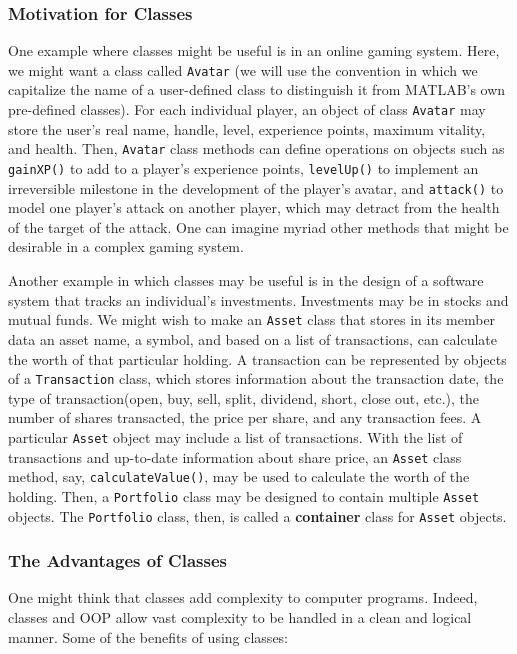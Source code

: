\subsubsection{Motivation for Classes}
One example where classes might be useful is in an online gaming system. Here, we might want a class called \texttt{Avatar} (we will use the convention in which we capitalize the name of a user-defined class to distinguish it from MATLAB's own pre-defined classes). For each individual player, an object of class \texttt{Avatar} may store the user's real name, handle, level, experience points, maximum vitality, and health. Then, \texttt{Avatar} class methods can define operations on objects such as \texttt{gainXP()} to add to a player's experience points, \texttt{levelUp()} to implement an irreversible milestone in the development of the player's avatar, and \texttt{attack()} to model one player's attack on another player, which may detract from the health of the target of the attack. One can imagine myriad other methods that might be desirable in a complex gaming system.

Another example in which classes may be useful is in the design of a software system that tracks an individual's investments. Investments may be in stocks and mutual funds. We might wish to make an \texttt{Asset} class that stores in its member data an asset name, a symbol, and based on a list of transactions, can calculate the worth of that particular holding. A transaction can be represented by objects of a \texttt{Transaction} class, which stores information about the transaction date, the type of transaction(open, buy, sell, split, dividend, short, close out, etc.), the number of shares transacted, the price per share, and any transaction fees. A particular \texttt{Asset} object may include a list of transactions. With the list of transactions and up-to-date information about share price, an \texttt{Asset} class method, say, \texttt{calculateValue()}, may be used to calculate the worth of the holding. Then, a \texttt{Portfolio} class may be designed to contain multiple \texttt{Asset} objects. The \texttt{Portfolio} class, then, is called a \textbf{container} class for \texttt{Asset} objects.

\subsubsection{The Advantages of Classes}

One might think that classes add complexity to computer programs. Indeed, classes and OOP allow vast complexity to be handled in a clean and logical manner. Some of the benefits of using classes:

